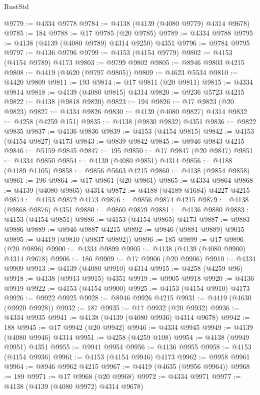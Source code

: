 \begin{lexlean}{RustStd}
\begin{coremodule}
@9779 := @4334 @9778
@9784 := @4138 (@4139 (@4080 @9779) @4314 @9678)
@9785 := 184
@9788 := @17 @9785 (@20 @9785)
@9789 := @4334 @9788
@9795 := @4138 (@4139 (@4080 @9789) @4314 @9250) @4351
@9796 := @9784 @9795
@9797 := @4136 @9796
@9799 := @4153 (@4154 @9779)
@9802 := @4153 (@4154 @9789) @4173
@9803 := @9799 @9802
@9805 := @8946 @9803 @4215
@9808 := @4419 (@4620 (@9797 @9805))
@9809 := @4623 @5534
@9810 := @4420 @9809
@9811 := 193
@9814 := @17 @9811 (@20 @9811)
@9815 := @4334 @9814
@9818 := @4139 (@4080 @9815) @4314
@9820 := @9236 @5723 @4215
@9822 := @4138 (@9818 @9820)
@9823 := 194
@9826 := @17 @9823 (@20 @9823)
@9827 := @4334 @9826
@9830 := @4139 (@4080 @9827) @4314
@9832 := @4258 (@4259 @151)
@9835 := @4138 (@9830 @9832) @4351
@9836 := @9822 @9835
@9837 := @4136 @9836
@9839 := @4153 (@4154 @9815)
@9842 := @4153 (@4154 @9827) @4173
@9843 := @9839 @9842
@9845 := @8946 @9843 @4215
@9846 := @5159 @9845
@9847 := 195
@9850 := @17 @9847 (@20 @9847)
@9851 := @4334 @9850
@9854 := @4139 (@4080 @9851) @4314
@9856 := @4188 (@4189 @1105)
@9858 := @9856 @5663 @4215
@9860 := @4138 (@9854 @9858)
@9861 := 196
@9864 := @17 @9861 (@20 @9861)
@9865 := @4334 @9864
@9868 := @4139 (@4080 @9865) @4314
@9872 := @4188 (@4189 @1684) @4227 @4215
@9874 := @4153 @9872 @4173
@9876 := @9856 @9874 @4215
@9879 := @4138 (@9868 @9876) @4351
@9880 := @9860 @9879
@9881 := @4136 @9880
@9883 := @4153 (@4154 @9851)
@9886 := @4153 (@4154 @9865) @4173
@9887 := @9883 @9886
@9889 := @8946 @9887 @4215
@9892 := @9846 (@9881 @9889) @9015
@9895 := @4419 (@9810 (@9837 @9892))
@9896 := 185
@9899 := @17 @9896 (@20 @9896)
@9900 := @4334 @9899
@9905 := @4138 (@4139 (@4080 @9900) @4314 @9678)
@9906 := 186
@9909 := @17 @9906 (@20 @9906)
@9910 := @4334 @9909
@9913 := @4139 (@4080 @9910) @4314
@9915 := @4258 (@4259 @96)
@9918 := @4138 (@9913 @9915) @4351
@9919 := @9905 @9918
@9920 := @4136 @9919
@9922 := @4153 (@4154 @9900)
@9925 := @4153 (@4154 @9910) @4173
@9926 := @9922 @9925
@9928 := @8946 @9926 @4215
@9931 := @4419 (@4630 (@9920 @9928))
@9932 := 187
@9935 := @17 @9932 (@20 @9932)
@9936 := @4334 @9935
@9941 := @4138 (@4139 (@4080 @9936) @4314 @9678)
@9942 := 188
@9945 := @17 @9942 (@20 @9942)
@9946 := @4334 @9945
@9949 := @4139 (@4080 @9946) @4314
@9951 := @4258 (@4259 @108)
@9954 := @4138 (@9949 @9951) @4351
@9955 := @9941 @9954
@9956 := @4136 @9955
@9958 := @4153 (@4154 @9936)
@9961 := @4153 (@4154 @9946) @4173
@9962 := @9958 @9961
@9964 := @8946 @9962 @4215
@9967 := @4419 (@4635 (@9956 @9964))
@9968 := 189
@9971 := @17 @9968 (@20 @9968)
@9972 := @4334 @9971
@9977 := @4138 (@4139 (@4080 @9972) @4314 @9678)

\end{coremodule}
\end{lexlean}
